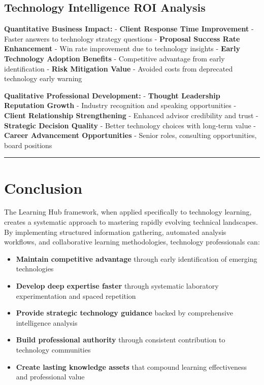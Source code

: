 \documentclass[
  letterpaper,
  DIV=11,
  numbers=noendperiod]{scrartcl}
\providecommand{\tightlist}{%
  \setlength{\itemsep}{0pt}\setlength{\parskip}{0pt}}\usepackage{longtable,booktabs,array}
\begin{document}
\subsection{Technology Intelligence ROI
Analysis}\label{technology-intelligence-roi-analysis}

\textbf{Quantitative Business Impact:} - \textbf{Client Response Time
Improvement} - Faster answers to technology strategy questions -
\textbf{Proposal Success Rate Enhancement} - Win rate improvement due to
technology insights - \textbf{Early Technology Adoption Benefits} -
Competitive advantage from early identification - \textbf{Risk
Mitigation Value} - Avoided costs from deprecated technology early
warning

\textbf{Qualitative Professional Development:} - \textbf{Thought
Leadership Reputation Growth} - Industry recognition and speaking
opportunities - \textbf{Client Relationship Strengthening} - Enhanced
advisor credibility and trust - \textbf{Strategic Decision Quality} -
Better technology choices with long-term value - \textbf{Career
Advancement Opportunities} - Senior roles, consulting opportunities,
board positions

\begin{center}\rule{0.5\linewidth}{0.5pt}\end{center}

\section{Conclusion}\label{conclusion}

The Learning Hub framework, when applied specifically to technology
learning, creates a systematic approach to mastering rapidly evolving
technical landscapes. By implementing structured information gathering,
automated analysis workflows, and collaborative learning methodologies,
technology professionals can:

\begin{itemize}
\tightlist
\item
  \textbf{Maintain competitive advantage} through early identification
  of emerging technologies
\item
  \textbf{Develop deep expertise faster} through systematic laboratory
  experimentation and spaced repetition
\item
  \textbf{Provide strategic technology guidance} backed by comprehensive
  intelligence analysis
\item
  \textbf{Build professional authority} through consistent contribution
  to technology communities
\item
  \textbf{Create lasting knowledge assets} that compound learning
  effectiveness and professional value
\end{itemize}
\end{document}
